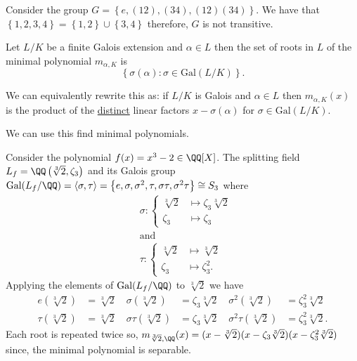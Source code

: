 \documentclass[12pt, a4paper]{article}
\newcommand{\gal}{\text{Gal}}
\begin{document}
\begin{example}
    Consider the group \(G = \left\{ e,(12),(34),(12)(34) \right\}\). We have that \\\(\left\{ 1,2,3,4 \right\} = \left\{ 1,2 \right\} \cup \left\{ 3,4 \right\}\) therefore, \(G\) is not transitive.
\end{example}

\begin{mdlemma}
    Let \(L/K\) be a finite Galois extension and \(\alpha \in L\) then the set of roots in \(L\) of the minimal polynomial \(m_{\alpha,K}\) is 
    \[\left\{ \sigma(\alpha): \sigma \in \gal(L/K) \right\}.\]
\end{mdlemma}

\begin{mdremark}
    We can equivalently rewrite this as: if \(L/K\) is Galois and \(\alpha \in L\) then \(m_{\alpha,K}(x)\) is the product of the \ul{distinct} linear factors \(x-\sigma(\alpha)\) for \(\sigma\in \gal(L/K)\).
\end{mdremark}

\begin{mdnote}
    We can use this find minimal polynomials.
\end{mdnote}

\begin{mdexample}
    Consider the polynomial \(f(x) = x^3-2 \in \QQ[X]\). The splitting field \(L_f = \QQ\left( \sqrt[3]{2},\zeta_3 \right)\) and its Galois group \(\gal(L_f/\QQ) = \langle \sigma, \tau \rangle  = \left\{ e,\sigma,\sigma^2,\tau,\sigma\tau,\sigma^2\tau \right\} \cong S_3\) where 
    \[\begin{aligned}
        &\sigma : \begin{cases}
            \sqrt[3]{2} &\mapsto \zeta_3\sqrt[3]{2} \\
            \zeta_3 &\mapsto \zeta_3
        \end{cases}\\
        &\text{and} \\
        &\tau: \begin{cases}
            \sqrt[3]{2} &\mapsto \sqrt[3]{2} \\
            \zeta_3 &\mapsto \zeta_3^2.
        \end{cases}
    \end{aligned}\]
    Applying the elements of \(\gal(L_f/\QQ)\) to \(\sqrt[3]{2}\) we have
    \[\begin{aligned}
        e(\sqrt[3]{2})&=\sqrt[3]{2} \quad \sigma(\sqrt[3]{2})&=\zeta_3\sqrt[3]{2} \quad \sigma^2(\sqrt[3]{2}) &= \zeta_3^2 \sqrt[3]{2} \\
        \tau(\sqrt[3]{2})&=\sqrt[3]{2} \quad \sigma\tau(\sqrt[3]{2}) &= \zeta_3\sqrt[3]{2} \quad \sigma^2\tau(\sqrt[3]{2}) &= \zeta_3^2\sqrt[3]{2}.
    \end{aligned}\]
    Each root is repeated twice so, \(m_{\sqrt[3]{2},\QQ}(x)=(x-\sqrt[3]{2})(x-\zeta_3\sqrt[3]{2})(x-\zeta^2_3\sqrt[3]{2})\)
    since, the minimal polynomial is separable.
\end{mdexample}
\end{document}
